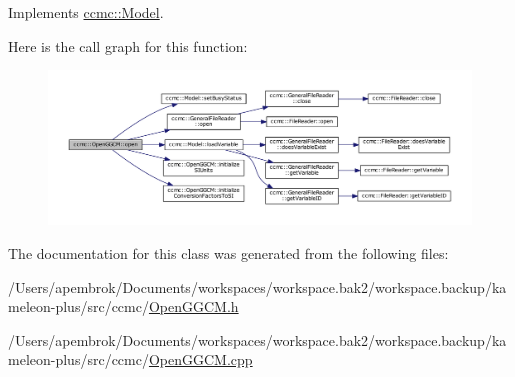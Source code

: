 Implements \hyperlink{classccmc_1_1_model_a3c64dc635c2c1a2fe2f8efa2a3666282}{ccmc\-::\-Model}.



Here is the call graph for this function\-:\nopagebreak
\begin{figure}[H]
\begin{center}
\leavevmode
\includegraphics[width=350pt]{classccmc_1_1_open_g_g_c_m_a899907309758135dbabc0d3c7b465900_cgraph}
\end{center}
\end{figure}




The documentation for this class was generated from the following files\-:\begin{DoxyCompactItemize}
\item 
/\-Users/apembrok/\-Documents/workspaces/workspace.\-bak2/workspace.\-backup/kameleon-\/plus/src/ccmc/\hyperlink{_open_g_g_c_m_8h}{Open\-G\-G\-C\-M.\-h}\item 
/\-Users/apembrok/\-Documents/workspaces/workspace.\-bak2/workspace.\-backup/kameleon-\/plus/src/ccmc/\hyperlink{_open_g_g_c_m_8cpp}{Open\-G\-G\-C\-M.\-cpp}\end{DoxyCompactItemize}
